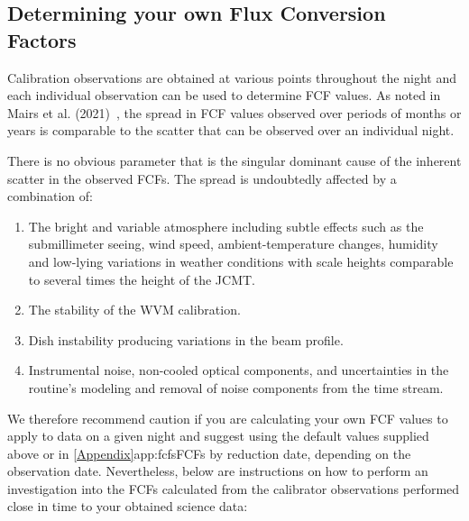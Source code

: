 \subsection{Determining your own Flux Conversion Factors}
\label{sec:own_fcf}

Calibration observations are obtained at various points throughout the
night and each individual observation can be used to determine FCF values.
As noted in Mairs et al. (2021)~\cite{mairs21}, the spread in FCF values observed 
over periods of months or years is comparable to the scatter that can be observed
over an individual night.  

There is no obvious parameter that is the singular dominant cause of the inherent scatter 
in the observed FCFs. The spread is undoubtedly affected by a combination of:

\begin{enumerate}

\item The bright and variable atmosphere including subtle effects such as the 
submillimeter seeing, wind speed, ambient-temperature changes, humidity and low-lying variations 
in weather conditions with scale heights comparable to several times the height of the JCMT.

\item The stability of the WVM calibration. 

\item Dish instability producing variations in the beam profile.

\item Instrumental noise, non-cooled optical components, and uncertainties in the {} routine's 
modeling and removal of noise components from the time stream.

\end{enumerate}

We therefore recommend caution if you are calculating your own FCF 
values to apply to data on a given night and suggest using the default values
supplied above or in \cref{Appendix}{app:fcfs}{FCFs by reduction date}, depending on the observation date.
Nevertheless, below are instructions on how to perform an investigation into 
the FCFs calculated from the calibrator observations performed close in time 
to your obtained science data:

